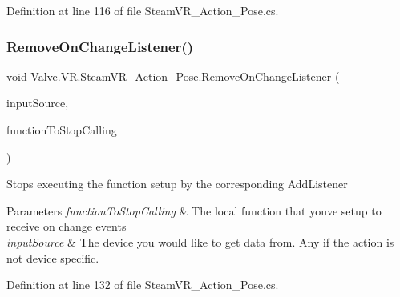 Definition at line 116 of file Steam\+V\+R\+\_\+\+Action\+\_\+\+Pose.\+cs.

\mbox{\label{class_valve_1_1_v_r_1_1_steam_v_r___action___pose_a07b2100fe3b2f2a0649bbbef72b52563}} 
\subsubsection{\texorpdfstring{RemoveOnChangeListener()}{RemoveOnChangeListener()}}
{\footnotesize\ttfamily void Valve.\+V\+R.\+Steam\+V\+R\+\_\+\+Action\+\_\+\+Pose.\+Remove\+On\+Change\+Listener (\begin{DoxyParamCaption}\item[{\mbox{\hyperlink{namespace_valve_1_1_v_r_a82e5bf501cc3aa155444ee3f0662853f}{Steam\+V\+R\+\_\+\+Input\+\_\+\+Sources}}}]{input\+Source,  }\item[{\mbox{\hyperlink{class_valve_1_1_v_r_1_1_steam_v_r___action___pose_ac9415e6ad971e70311f59ff1bfb4ea76}{Change\+Handler}}}]{function\+To\+Stop\+Calling }\end{DoxyParamCaption})}



Stops executing the function setup by the corresponding Add\+Listener 


\begin{DoxyParams}{Parameters}
{\em function\+To\+Stop\+Calling} & The local function that you\textquotesingle{}ve setup to receive on change events\\
\hline
{\em input\+Source} & The device you would like to get data from. Any if the action is not device specific.\\
\hline
\end{DoxyParams}


Definition at line 132 of file Steam\+V\+R\+\_\+\+Action\+\_\+\+Pose.\+cs.

\mbox{\label{class_valve_1_1_v_r_1_1_steam_v_r___action___pose_a54898147219ffbaedaaac791123327b2}} 
